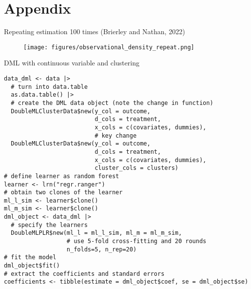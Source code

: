 \documentclass[10pt,table,aspectratio=169]{beamer}
\begin{document}
\section{Appendix}

\begin{frame}[plain, label = two_dimensions]{Repeating estimation 100 times (Brierley and Nathan, 2022)}

\begin{figure}[H]
  \centering
  \texttt{[image: figures/observational\_density\_repeat.png]}
\end{figure}
\end{frame}


\begin{frame}[plain,fragile,label=two_dimensions]{DML with continuous variable and clustering}
\begin{verbatim}
data_dml <- data |>
  # turn into data.table
  as.data.table() |>
  # create the DML data object (note the change in function)
  DoubleMLClusterData$new(y_col = outcome,
                          d_cols = treatment,
                          x_cols = c(covariates, dummies),
                          # key change
  DoubleMLClusterData$new(y_col = outcome,
                          d_cols = treatment,
                          x_cols = c(covariates, dummies),
                          cluster_cols = clusters)
# define learner as random forest
learner <- lrn("regr.ranger")
# obtain two clones of the learner
ml_l_sim <- learner$clone()
ml_m_sim <- learner$clone()
dml_object <- data_dml |>
  # specify the learners
  DoubleMLPLR$new(ml_l = ml_l_sim, ml_m = ml_m_sim,
                  # use 5-fold cross-fitting and 20 rounds
                  n_folds=5, n_rep=20)
# fit the model
dml_object$fit()
# extract the coefficients and standard errors
coefficients <- tibble(estimate = dml_object$coef, se = dml_object$se)
\end{verbatim}
\end{frame}
\end{document}
